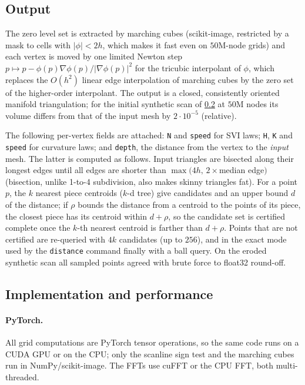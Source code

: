 \documentclass[11pt]{article}
\newcommand{\code}[1]{\texttt{#1}}
\begin{document}
\subsection{Output}

The zero level set is extracted by marching cubes (scikit-image, restricted by a mask to cells with
$|\phi|<2h$, which makes it fast even on $50$M-node grids) and each vertex is moved by one limited Newton
step $p\mapsto p-\phi(p)\nabla\phi(p)/|\nabla\phi(p)|^2$ for the tricubic interpolant of $\phi$, which
replaces the $O(h^2)$ linear edge interpolation of marching cubes by the zero set of the higher-order
interpolant. The output is a closed, consistently oriented manifold triangulation; for the initial
synthetic scan of \cref{sec:perf} at $50$M nodes its volume differs from that of the input mesh by
$2\cdot10^{-5}$ (relative).

The following per-vertex fields are attached: \code{N} and \code{speed} for SVI laws; \code{H},
\code{K} and \code{speed} for curvature laws; and \code{depth}, the distance from the vertex to the
\emph{input} mesh. The latter is computed as follows. Input triangles are bisected along their longest
edges until all edges are shorter than $\max(4h,\,2\times$median edge$)$ (bisection, unlike 1-to-4
subdivision, also makes skinny triangles fat). For a point $p$, the $k$ nearest piece centroids
($k$-d tree) give candidates and an upper bound $d$ of the distance; if $\rho$ bounds the distance from a
centroid to the points of its piece, the closest piece has its centroid within $d+\rho$, so the candidate
set is certified complete once the $k$-th nearest centroid is farther than $d+\rho$. Points that are not
certified are re-queried with $4k$ candidates (up to $256$), and in the exact mode used by the
\code{distance} command finally with a ball query. On the eroded synthetic scan all sampled points
agreed with brute force to float32 round-off.

\subsection{Implementation and performance}\label{sec:perf}

\paragraph{PyTorch.} All grid computations are PyTorch tensor operations, so the same code runs on a CUDA
GPU or on the CPU; only the scanline sign test and the marching cubes run in NumPy/scikit-image. The
FFTs use cuFFT or the CPU FFT, both multi-threaded.
\end{document}
